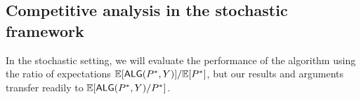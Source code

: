 

\subsection{Competitive analysis in the stochastic framework}\label{subsec: competitive analysis in stochastic framework}
In the stochastic setting, we will evaluate the performance of the algorithm using the ratio of expectations $\mathbb{E}[\mbox{\textup{\textsf{ALG}}}(P^*,Y)]/\mathbb{E}[P^*]$, but our results and arguments transfer readily to $\mathbb{E}[\mbox{\textup{\textsf{ALG}}}(P^*,Y)/P^*]$.


%


